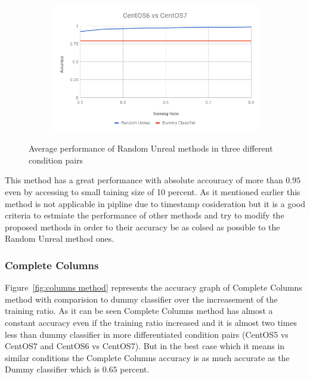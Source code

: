 \documentclass[10pt, conference, compsocconf]{IEEEtran}
\begin{document}
\begin{figure}[h!]
\begin{subfigure}[b]{0.8\linewidth}
                \includegraphics[width=\columnwidth]{figures/ALS/unreal-ALS-6vs7-PFS}
        \end{subfigure}
        \caption{Average performance of Random Unreal methods in three different condition pairs}
        \label{fig:unreal method}
\end{figure}
This method has a great performance with absolute accouracy of more than $0.95$ even by accessing to small taining size of 10 percent. As it mentioned earlier this method is not applicable in pipline due to timestamp cosideration but it is a good criteria to estmiate the performance of other methods and try to modify the proposed methods in order to their accuracy be as colsed as possible to the Random Unreal method ones.  


\subsubsection{Complete Columns}

Figure~\ref{fig:columns method} represents
the accuracy graph of Complete Columns method with comparision to dummy
classifier over the increasement of the training ratio.
As it can be seen Complete Columns method has
almost a constant accuracy even if the training ratio increased and it
is almost two times less than dummy classifier in more differentiated
condition pairs (CentOS5 vs CentOS7 and CentOS6 vs CentOS7). But in the
best case which it means in similar conditions the Complete Columns
accuracy is as much accurate as the Dummy classifier which is $0.65$
percent.
\end{document}
